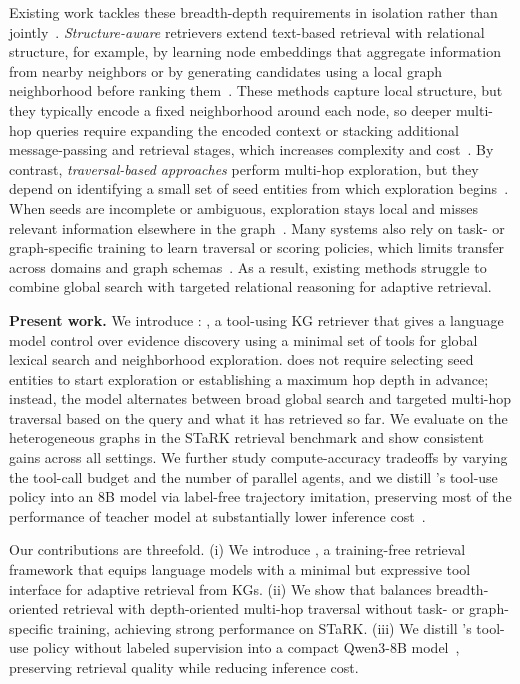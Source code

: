 Existing work tackles these breadth-depth requirements in isolation rather than jointly~\cite{ko2025cooprags,ma2025think,wang2025corag}. \emph{Structure-aware} retrievers extend text-based retrieval with relational structure, for example, by learning node embeddings that aggregate information from nearby neighbors or by generating candidates using a local graph neighborhood before ranking them~\cite{lee_hybgrag_2025,zhu_knowledge_2025,lei_mixture_2025}. These methods capture local structure, but they typically encode a fixed neighborhood around each node, so deeper multi-hop queries require expanding the encoded context or stacking additional message-passing and retrieval stages, which increases complexity and cost~\cite{wan2025digest,hu2025remindrag,verma2024plan}. By contrast, \emph{traversal-based approaches} perform multi-hop exploration, but they depend on identifying a small set of seed entities from which exploration begins~\cite{markowitz_tree--traversals_2024,sun_think--graph_2024}. When seeds are incomplete or ambiguous, exploration stays local and misses relevant information elsewhere in the graph~\cite{liu2025ontology,ma2025think}. Many systems also rely on task- or graph-specific training to learn traversal or scoring policies, which limits transfer across domains and graph schemas~\cite{li_multi-field_2025,lei_mixture_2025,wu_avatar_2024,yu_can_2025}. As a result, existing methods struggle to combine global search with targeted relational reasoning for adaptive retrieval.


\textbf{Present work.}
We introduce \textbf{\retrieverShort}: \retriever, a tool-using KG retriever that gives a language model control over evidence discovery using a minimal set of tools for global lexical search and neighborhood exploration. \retrieverShort does not require selecting seed entities to start exploration or establishing a maximum hop depth in advance; instead, the model alternates between broad global search and targeted multi-hop traversal based on the query and what it has retrieved so far. We evaluate \retrieverShort on the heterogeneous graphs in the STaRK retrieval benchmark and show consistent gains across all settings. We further study compute-accuracy tradeoffs by varying the tool-call budget and the number of parallel agents, and we distill \retrieverShort's tool-use policy into an 8B model via label-free trajectory imitation, preserving most of the performance of teacher model at substantially lower inference cost~\cite{kang_distilling_2025}.

Our contributions are threefold. (i) We introduce \retriever, a training-free retrieval framework that equips language models with a minimal but expressive tool interface for adaptive retrieval from KGs. (ii) We show that \retrieverShort balances breadth-oriented retrieval with depth-oriented multi-hop traversal without task- or graph-specific training, achieving strong performance on STaRK. (iii) We distill \retrieverShort's tool-use policy without labeled supervision into a compact Qwen3-8B model~\cite{yang_qwen3_2025,kang_distilling_2025}, preserving retrieval quality while reducing inference cost.
